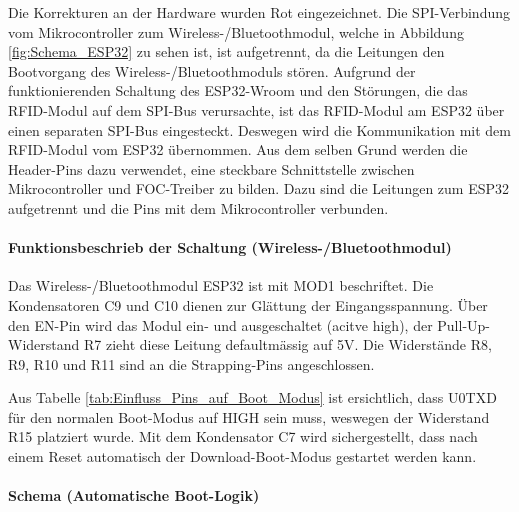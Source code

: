 Die Korrekturen an der Hardware wurden Rot eingezeichnet. Die SPI-Verbindung vom Mikrocontroller zum Wireless-/Bluetoothmodul, welche in Abbildung \ref{fig:Schema_ESP32} zu sehen ist, ist aufgetrennt, da die Leitungen den Bootvorgang des Wireless-/Bluetoothmoduls stören. Aufgrund der funktionierenden Schaltung des ESP32-Wroom und den Störungen, die das RFID-Modul auf dem SPI-Bus verursachte, ist das RFID-Modul am ESP32 über einen separaten SPI-Bus eingesteckt. Deswegen wird die Kommunikation mit dem RFID-Modul vom ESP32 übernommen. Aus dem selben Grund werden die Header-Pins dazu verwendet, eine steckbare Schnittstelle zwischen Mikrocontroller und FOC-Treiber zu bilden. Dazu sind die Leitungen zum ESP32 aufgetrennt und die Pins mit dem Mikrocontroller verbunden.
\newpage
\paragraph{Funktionsbeschrieb der Schaltung (Wireless-/Bluetoothmodul)}\mbox{}

Das Wireless-/Bluetoothmodul ESP32 ist mit MOD1 beschriftet. Die Kondensatoren C9 und C10 dienen zur Glättung der Eingangsspannung. Über den EN-Pin wird das Modul ein- und ausgeschaltet (acitve high), der Pull-Up-Widerstand R7 zieht diese Leitung defaultmässig auf 5V. Die Widerstände R8, R9, R10 und R11 sind an die Strapping-Pins angeschlossen.

Aus Tabelle \ref{tab:Einfluss_Pins_auf_Boot_Modus} ist ersichtlich, dass U0TXD für den normalen Boot-Modus auf HIGH sein muss, weswegen der Widerstand R15 platziert wurde. Mit dem Kondensator C7 wird sichergestellt, dass nach einem Reset automatisch der Download-Boot-Modus gestartet werden kann.


\paragraph{Schema (Automatische Boot-Logik)}\mbox{}

